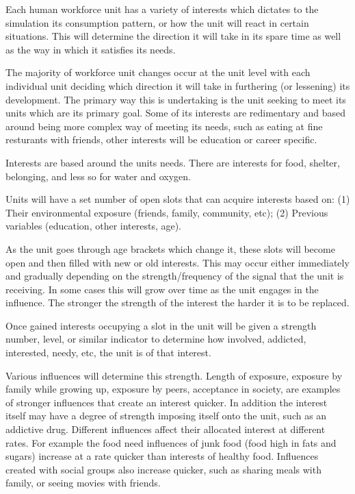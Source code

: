 Each human workforce unit has a variety of interests which dictates to the simulation its consumption pattern, or how the unit will react in certain situations. This will determine the direction it will take in its spare time as well as the way in which it satisfies its needs. 

The majority of workforce unit changes occur at the unit level with each individual unit deciding which direction it will take in furthering (or lessening) its development. The primary way this is undertaking is the unit seeking to meet its units which are its primary goal. Some of its interests are redimentary and based around being more complex way of meeting its needs, such as eating at fine resturants with friends, other interests will be education or career specific. 

Interests are based around the units needs. There are interests for food, shelter, belonging, and less so for water and oxygen.

Units will have a set number of open slots that can acquire interests based on: (1) Their environmental exposure (friends, family, community, etc); (2) Previous variables (education, other interests, age).


As the unit goes through age brackets which change it, these slots will become open and then filled with new or old interests. This may occur either immediately and gradually depending on the strength/frequency of the signal that the unit is receiving. In some cases this will grow over time as the unit engages in the influence. The stronger the strength of the interest the harder it is to be replaced.

Once gained interests occupying a slot in the unit will be given a strength number, level, or similar indicator to determine how involved, addicted, interested, needy, etc, the unit is of that interest. 

Various influences will determine this strength. Length of exposure, exposure by family while growing up, exposure by peers, acceptance in society, are examples of stronger influences that create an interest quicker. In addition the interest itself may have a degree of strength imposing itself onto the unit, such as an addictive drug. Different influences affect their allocated interest at different rates. For example the food need influences of junk food (food high in fats and sugars) increase at a rate quicker than interests of healthy food. Influences created with social groups also increase quicker, such as sharing meals with family, or seeing movies with friends.


